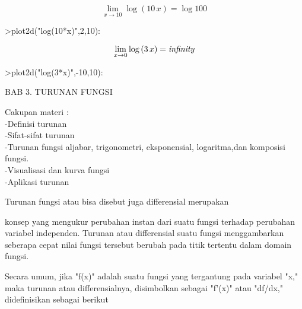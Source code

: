 \documentclass[a4paper,10pt]{article}
\begin{document}
\begin{eulernotebook}
\begin{eulercomment}
\begin{eulercomment}
\begin{eulercomment}
\begin{eulercomment}
\begin{eulercomment}
\begin{eulercomment}
\begin{eulercomment}
\begin{eulercomment}
\begin{eulercomment}
\begin{eulercomment}
\begin{eulerformula}
\[
\lim_{x\rightarrow 10}{\log \left(10\,x\right)}=\log 100
\]
\end{eulerformula}
\begin{eulerprompt}
>plot2d("log(10*x)",2,10):
\end{eulerprompt}
\begin{eulerformula}
\[
\lim_{x\rightarrow 0}{\log \left(3\,x\right)}={\it infinity}
\]
\end{eulerformula}
\begin{eulerprompt}
>plot2d("log(3*x)",-10,10):
\end{eulerprompt}
\eulersubheading{}
\begin{eulercomment}
BAB 3. TURUNAN FUNGSI

Cakupan materi :\\
-Definisi turunan\\
-Sifat-sifat turunan\\
-Turunan fungsi aljabar, trigonometri, eksponensial, logaritma,dan
komposisi fungsi.\\
-Visualisasi dan kurva fungsi\\
-Aplikasi turunan

\begin{eulercomment}
\begin{eulercomment}
\end{eulercomment}
\begin{eulerttcomment}
     Turunan fungsi atau bisa disebut juga differensial merupakan
\end{eulerttcomment}
\begin{eulercomment}
konsep yang mengukur perubahan instan dari suatu fungsi terhadap
perubahan variabel independen. Turunan atau differensial suatu fungsi
menggambarkan seberapa cepat nilai fungsi tersebut berubah pada titik
tertentu dalam domain fungsi.

Secara umum, jika "f(x)" adalah suatu fungsi yang tergantung pada
variabel "x," maka turunan atau differensialnya, disimbolkan sebagai
"f'(x)" atau "df/dx," didefinisikan sebagai berikut


\end{eulercomment}
\end{eulercomment}
\end{eulercomment}
\end{eulercomment}
\end{eulercomment}
\end{eulercomment}
\end{eulercomment}
\end{eulercomment}
\end{eulercomment}
\end{eulercomment}
\end{eulercomment}
\end{eulercomment}
\end{eulercomment}
\end{eulernotebook}
\end{document}
